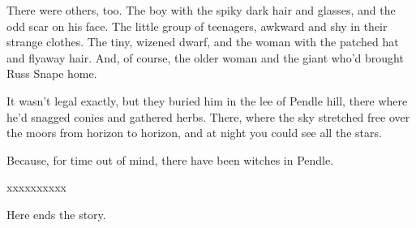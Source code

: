 \documentclass[a4paper,11pt]{article}
\begin{document}
There were others, too. The boy with the spiky dark hair and glasses, and the odd scar on his face. The little group of teenagers, awkward and shy in their strange clothes. The tiny, wizened dwarf, and the woman with the patched hat and flyaway hair. And, of course, the older woman and the giant who'd brought Russ Snape home.

It wasn't legal exactly, but they buried him in the lee of Pendle hill, there where he'd snagged conies and gathered herbs. There, where the sky stretched free over the moors from horizon to horizon, and at night you could see all the stars.

Because, for time out of mind, there have been witches in Pendle.

xxxxxxxxxx

Here ends the story.
\end{document}
